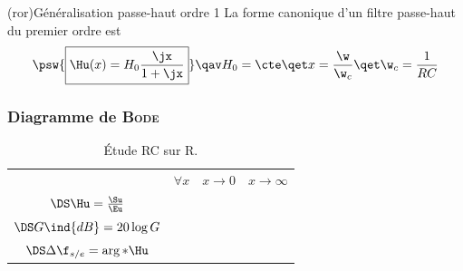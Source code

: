 \documentclass[../../main/main.tex]{subfiles}
\begin{document}
\begin{tcb}(ror){Généralisation passe-haut ordre 1}
	La forme canonique d'un filtre passe-haut du premier ordre est
	\[
		\psw{%
			\boxed{\Hu(x) = H_0\frac{\jx}{1+\jx}}
		}%
		\qav
		H_0 = \cte
		\qet
		x = \frac{\w}{\w_c}
		\qet
		\w_c = \frac{1}{RC}
	\]
	\vspace{-15pt}
\end{tcb}

\subsubsection{Diagramme de \textsc{Bode}}
\begin{table}[htbp!]
	\centering
	\caption{Étude RC sur R.}
	\begin{tabularx}{\linewidth}{cYYY}
		\toprule
		 &
		$\forall x$
		 &
		$x\to 0$
		 &
		$x\to\infty$
		\\
		\addlinespace[0.5em]
		\cmidrule(lr){2-4}
		$\DS\Hu = \frac{\Su}{\Eu}$
		 &
		 &
		 &
		\\
		\addlinespace[0.5em]
		$\DS G\ind{dB} = 20 \log G$
		 &
		 &
		 &
		\\
		\addlinespace[0.5em]
		$\DS\Delta\f_{s/e} = \arg*{\Hu}$
		 &
		 &
		 &
		\\
		\bottomrule
	\end{tabularx}
	\label{tab:rcr}
\end{table}
\end{document}
